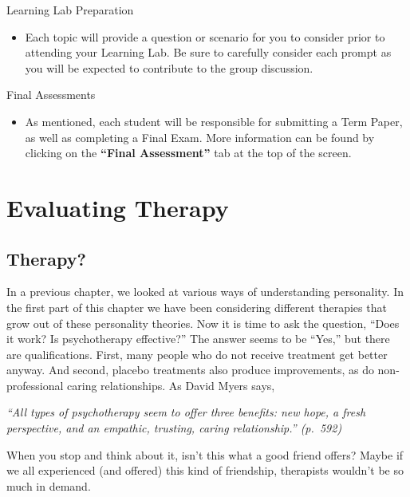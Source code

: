 \documentclass[
]{book}
\providecommand{\tightlist}{%
  \setlength{\itemsep}{0pt}\setlength{\parskip}{0pt}}
\begin{document}
\begin{reflect}
{Learning Lab Preparation}

\begin{itemize}
\tightlist
\item
  Each topic will provide a question or scenario for you to consider prior to attending your Learning Lab. Be sure to carefully consider each prompt as you will be expected to contribute to the group discussion.
\end{itemize}

{Final Assessments}

\begin{itemize}
\tightlist
\item
  As mentioned, each student will be responsible for submitting a Term Paper, as well as completing a Final Exam. More information can be found by clicking on the \textbf{``Final Assessment''} tab at the top of the screen.
\end{itemize}
\end{reflect}

\hypertarget{evaluating-therapy-1}{%
\section{Evaluating Therapy}\label{evaluating-therapy-1}}

\hypertarget{therapy-1}{%
\subsection*{Therapy?}\label{therapy-1}}

In a previous chapter, we looked at various ways of understanding personality. In the first part of this chapter we have been considering different therapies that grow out of these personality theories. Now it is time to ask the question, ``Does it work? Is psychotherapy effective?'' The answer seems to be ``Yes,'' but there are qualifications. First, many people who do not receive treatment get better anyway. And second, placebo treatments also produce improvements, as do non-professional caring relationships. As David Myers says,

\emph{``All types of psychotherapy seem to offer three benefits: new hope, a fresh perspective, and an empathic, trusting, caring relationship.'' (p.~592)}

When you stop and think about it, isn't this what a good friend offers? Maybe if we all experienced (and offered) this kind of friendship, therapists wouldn't be so much in demand.
\end{document}
